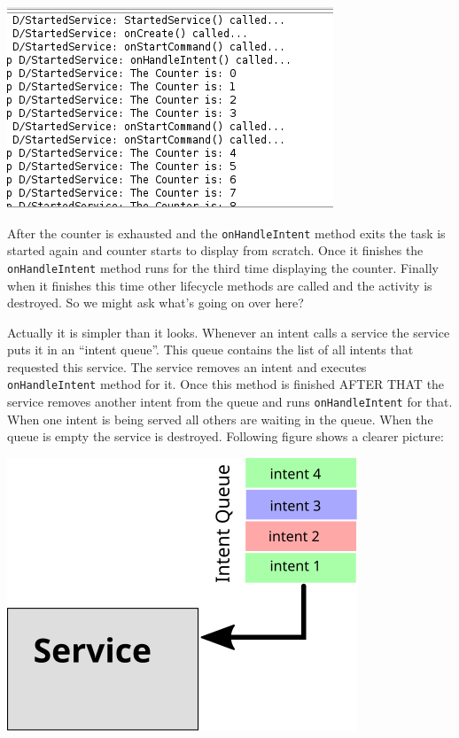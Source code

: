 \begin{center}
	\includegraphics[scale=\SourceCodeScale]{chapters/ch14/images/16}
\end{center}

After the counter is exhausted and the \texttt{onHandleIntent} method exits the task is started again and counter starts to display from scratch. Once it finishes the \texttt{onHandleIntent} method runs for the third time displaying the counter. Finally when it finishes this time other lifecycle methods are called and the activity is destroyed. So we might ask what's going on over here?

Actually it is simpler than it looks. Whenever an intent calls a service the service puts it in an ``intent queue''. This queue contains the list of all intents that requested this service. The service removes an intent and executes \texttt{onHandleIntent} method for it. Once this method is finished AFTER THAT the service removes another intent from the queue and runs \texttt{onHandleIntent} for that. When one intent is being served all others are waiting in the queue. When the queue is empty the service is destroyed. Following figure shows a clearer picture:

\begin{center}
	\includegraphics[scale=0.8]{chapters/ch14/images/17}
\end{center}

